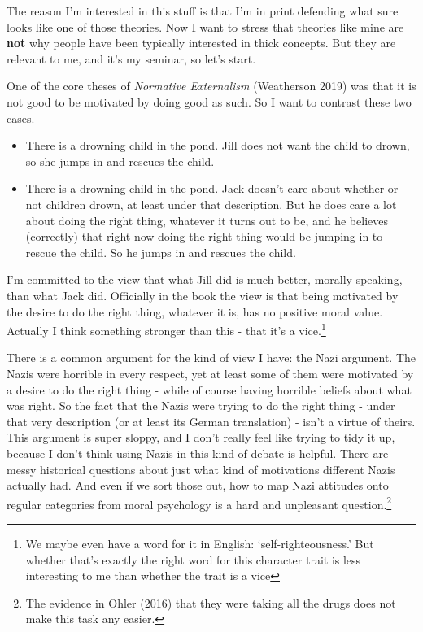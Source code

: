 \documentclass[
]{article}
\providecommand{\tightlist}{%
  \setlength{\itemsep}{0pt}\setlength{\parskip}{0pt}}
\begin{document}
The reason I'm interested in this stuff is that I'm in print defending
what sure looks like one of those theories. Now I want to stress that
theories like mine are \textbf{not} why people have been typically
interested in thick concepts. But they are relevant to me, and it's my
seminar, so let's start.

One of the core theses of \emph{Normative Externalism} (Weatherson 2019)
was that it is not good to be motivated by doing good as such. So I want
to contrast these two cases.

\begin{itemize}
\tightlist
\item
  There is a drowning child in the pond. Jill does not want the child to
  drown, so she jumps in and rescues the child.
\item
  There is a drowning child in the pond. Jack doesn't care about whether
  or not children drown, at least under that description. But he does
  care a lot about doing the right thing, whatever it turns out to be,
  and he believes (correctly) that right now doing the right thing would
  be jumping in to rescue the child. So he jumps in and rescues the
  child.
\end{itemize}

I'm committed to the view that what Jill did is much better, morally
speaking, than what Jack did. Officially in the book the view is that
being motivated by the desire to do the right thing, whatever it is, has
no positive moral value. Actually I think something stronger than this -
that it's a vice.\footnote{We maybe even have a word for it in English:
  `self-righteousness.' But whether that's exactly the right word for
  this character trait is less interesting to me than whether the trait
  is a vice}

There is a common argument for the kind of view I have: the Nazi
argument. The Nazis were horrible in every respect, yet at least some of
them were motivated by a desire to do the right thing - while of course
having horrible beliefs about what was right. So the fact that the Nazis
were trying to do the right thing - under that very description (or at
least its German translation) - isn't a virtue of theirs. This argument
is super sloppy, and I don't really feel like trying to tidy it up,
because I don't think using Nazis in this kind of debate is helpful.
There are messy historical questions about just what kind of motivations
different Nazis actually had. And even if we sort those out, how to map
Nazi attitudes onto regular categories from moral psychology is a hard
and unpleasant question.\footnote{The evidence in Ohler (2016) that they
  were taking all the drugs does not make this task any easier.}
\end{document}
